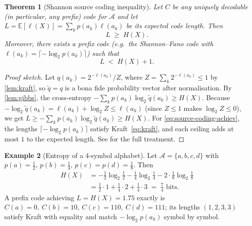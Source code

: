 \documentclass[12pt,a4paper]{article}
\theoremstyle{plain}
\newtheorem{theorem}{Theorem}[section]
\theoremstyle{definition}
\newtheorem{example}[theorem]{Example}
\begin{document}
\begin{theorem}[Shannon source coding inequality]
\label{thm:source-coding}
Let $C$ be any uniquely decodable (in particular, any prefix) code for
$\mathcal{A}$ and let $L = \mathbb{E}[\ell(X)] = \sum_k p(a_k)\ell(a_k)$
be its expected code length.  Then
\begin{equation}
  L \;\ge\; H(X).
  \label{eq:source-coding}
\end{equation}
Moreover, there exists a prefix code (e.g.\ the Shannon--Fano code
with $\ell(a_k) = \lceil -\log_2 p(a_k)\rceil$) such that
\begin{equation}
  L \;<\; H(X) + 1.
  \label{eq:source-coding-achiev}
\end{equation}
\end{theorem}

\begin{proof}[Proof sketch]
Let $q(a_k) = 2^{-\ell(a_k)} / Z$, where
$Z = \sum_k 2^{-\ell(a_k)} \le 1$ by \cref{lem:kraft}, so $\tilde q =
q$ is a bona fide probability vector after normalisation.  By
\cref{lem:gibbs}, the cross-entropy $-\sum_k p(a_k) \log_2 \tilde
q(a_k) \ge H(X)$.  Because $-\log_2 \tilde q(a_k) = \ell(a_k) + \log_2
Z \le \ell(a_k)$ (since $Z \le 1$ makes $\log_2 Z \le 0$), we get
$L \ge -\sum_k p(a_k)\log_2 \tilde q(a_k) \ge H(X)$.  For
\eqref{eq:source-coding-achiev}, the lengths
$\lceil -\log_2 p(a_k)\rceil$ satisfy Kraft~\eqref{eq:kraft}, and each
ceiling adds at most $1$ to the expected length.  See
\citet[Ch.~5]{coverthomas2006} for the full treatment.
\end{proof}

\begin{example}[Entropy of a 4-symbol alphabet]
\label{ex:h4}
Let $\mathcal{A} = \{a, b, c, d\}$ with $p(a) = \tfrac{1}{2}$,
$p(b) = \tfrac{1}{4}$, $p(c) = p(d) = \tfrac{1}{8}$.  Then
\begin{align*}
  H(X) &= -\tfrac{1}{2}\log_2\tfrac{1}{2}
         - \tfrac{1}{4}\log_2\tfrac{1}{4}
         - 2\cdot\tfrac{1}{8}\log_2\tfrac{1}{8} \\
       &= \tfrac{1}{2}\cdot 1 + \tfrac{1}{4}\cdot 2 + \tfrac{1}{4}\cdot 3
        \;=\; \tfrac{7}{4} \text{ bits}.
\end{align*}
A prefix code achieving $L = H(X) = 1.75$ exactly is
$C(a) = 0,\ C(b) = 10,\ C(c) = 110,\ C(d) = 111$; its lengths
$(1,2,3,3)$ satisfy Kraft with equality and match
$-\log_2 p(a_k)$ symbol by symbol.
\end{example}

\end{document}
